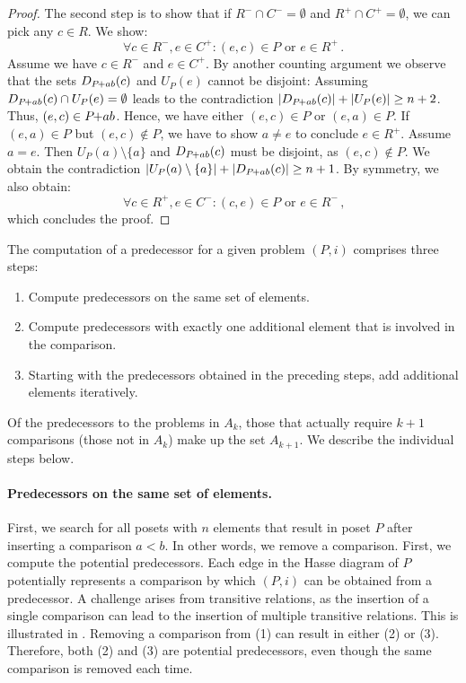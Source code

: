 \documentclass[twoside,leqno,twocolumn]{article}
\newcommand{\pchild}[3]{{#1}\kern-1pt{+}{#2}{#3}}
\newcommand{\less}[2]{D_{#1}(#2)}
\newcommand{\greater}[2]{U_{#1}(#2)}
\begin{document}
\begin{proof}
  The second step is to show that if $R^- \cap C^- = \emptyset$ and $R^+ \cap C^+ = \emptyset$, we can pick any $c \in R$.
  We show:
  \begin{equation}
    \forall c \in R^-, e \in C^+ \colon (e, c) \in P \text{ or } e \in R^+\,\text{.}
  \end{equation}
  Assume we have $c \in R^-$ and $e \in C^+$.
  By another counting argument we observe that the sets $\less{\pchild{P}{a}{b}}{c}$ and $\greater{P}{e}$ cannot be disjoint:
  Assuming $\less{\pchild{P}{a}{b}}{c} \cap \greater{P}{e} = \emptyset$ leads to the contradiction $|\less{\pchild{P}{a}{b}}{c}| + |\greater{P}{e}| \ge n + 2$.
  Thus, $(e, c) \in \pchild{P}{a}{b}$.
  Hence, we have either $(e, c) \in P$ or $(e, a) \in P$.
  If $(e, a) \in P$ but $(e, c) \notin P$, we have to show $a \neq e$ to conclude $e \in R^+$.
  Assume $a = e$.
  Then $\greater{P}{a} \setminus \{ a \}$ and $\less{\pchild{P}{a}{b}}{c}$ must be disjoint, as $(e, c) \notin P$.
  We obtain the contradiction $|\greater{P}{a} \setminus \{ a \}| + |\less{\pchild{P}{a}{b}}{c}| \ge n + 1$.
  By symmetry, we also obtain:
  \begin{equation}
    \forall c \in R^+, e \in C^- \colon (c, e) \in P \text{ or } e \in R^-\,\text{,}
  \end{equation}
  which concludes the proof.
\end{proof}

The computation of a predecessor for a given problem $(P, i)$ comprises three steps:
\begin{enumerate}
  \item Compute predecessors on the same set of elements.
  \item Compute predecessors with exactly one additional element that is involved in the comparison.
  \item Starting with the predecessors obtained in the preceding steps, add additional elements iteratively.
\end{enumerate}
Of the predecessors to the problems in $A_k$, those that actually require $k+1$ comparisons (those not in $A_k$) make up the set $A_{k+1}$.
We describe the individual steps below.

\paragraph{Predecessors on the same set of elements.}
First, we search for all posets with $n$ elements that result in poset $P$ after inserting a comparison $a < b$.
In other words, we remove a comparison.
First, we compute the potential predecessors.
Each edge in the Hasse diagram of $P$ potentially represents a comparison by which $(P, i)$ can be obtained from a predecessor.
A challenge arises from transitive relations, as the insertion of a single comparison can lead to the insertion of multiple transitive relations.
This is illustrated in .
Removing a comparison from (1) can result in either (2) or (3).
Therefore, both (2) and (3) are potential predecessors, even though the same comparison is removed each time.
\end{document}
